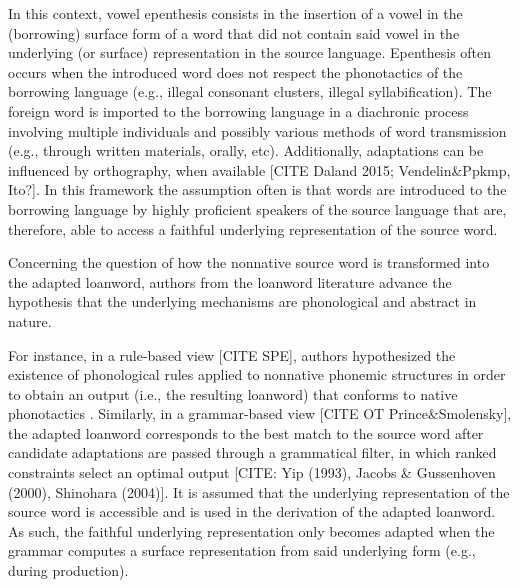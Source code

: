 In this context, vowel epenthesis consists in the insertion of a vowel in the (borrowing) surface form of a word that did not contain said vowel in the underlying (or surface) representation in the source language. Epenthesis often occurs when the introduced word does not respect the phonotactics of the borrowing language (e.g., illegal consonant clusters, illegal syllabification).
The foreign word is imported to the borrowing language in a diachronic process involving multiple individuals and possibly various methods of word transmission (e.g., through written materials, orally, etc). Additionally, adaptations can be influenced by orthography, when available [CITE Daland 2015; Vendelin\&Ppkmp, Ito?]. In this framework the assumption often is that words are introduced to the borrowing language by highly proficient speakers of the source language that are, therefore, able to access a faithful underlying representation of the source word. 

Concerning the question of how the nonnative source word is transformed into the adapted loanword, authors from the loanword literature advance the hypothesis that the underlying mechanisms are phonological and abstract in nature.

For instance, in a rule-based view [CITE SPE], authors hypothesized the existence of phonological rules applied to nonnative phonemic structures in order to obtain an output (i.e., the resulting loanword) that conforms to native phonotactics \cite{hyman1970, lovins1975}.
Similarly, in a grammar-based view [CITE OT Prince\&Smolensky], the adapted loanword corresponds to the best match to the source word after candidate adaptations are passed through a grammatical filter, in which ranked constraints select an optimal output [CITE: Yip (1993), Jacobs \& Gussenhoven (2000), Shinohara (2004)]. %
It is assumed that the underlying representation of the source word is accessible and is used in the derivation of the adapted loanword. As such, the faithful underlying representation only becomes adapted when the grammar computes a surface representation from said underlying form (e.g., during production).   \\

